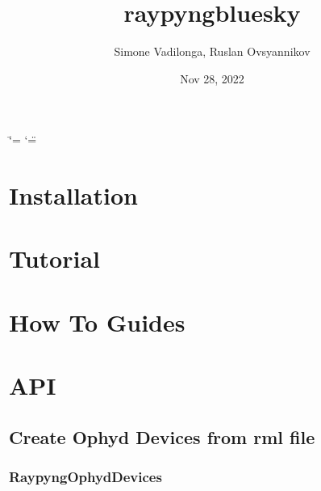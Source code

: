 \documentclass[letterpaper,10pt,english]{sphinxmanual}
\title{raypyng\sphinxhyphen{}bluesky}
\date{Nov 28, 2022}
\author{Simone Vadilonga, Ruslan Ovsyannikov}
\begin{document}
\ifdefined\shorthandoff
  \ifnum\catcode`\=\string=\active\shorthandoff{=}\fi
  \ifnum\catcode`\"=\active{}\fi
\fi

\pagestyle{empty}
\sphinxmaketitle
\pagestyle{plain}
\sphinxtableofcontents
\pagestyle{normal}
\label{\detokenize{index::doc}}


\sphinxstepscope


\chapter{Installation}
\label{\detokenize{installation:installation}}\label{\detokenize{installation::doc}}
\sphinxstepscope


\chapter{Tutorial}
\label{\detokenize{tutorial:tutorial}}\label{\detokenize{tutorial::doc}}
\sphinxstepscope


\chapter{How To Guides}
\label{\detokenize{how_to:how-to-guides}}\label{\detokenize{how_to::doc}}
\sphinxstepscope


\chapter{API}
\label{\detokenize{API:api}}\label{\detokenize{API::doc}}

\section{Create Ophyd Devices from rml file}
\label{\detokenize{API:create-ophyd-devices-from-rml-file}}

\subsection{RaypyngOphydDevices}
\label{\detokenize{API:raypyngophyddevices}}
\end{document}
